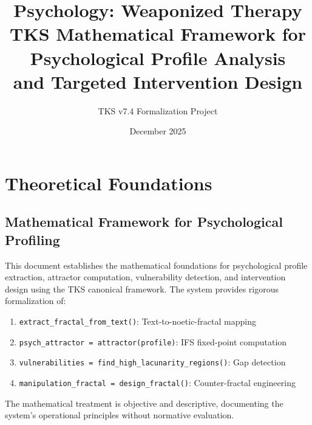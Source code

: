 \documentclass[11pt,twoside]{book}
\begin{document}
\title{\textbf{Psychology: Weaponized Therapy} \\[0.5em]
\Large TKS Mathematical Framework for Psychological Profile Analysis \\
and Targeted Intervention Design}
\author{TKS v7.4 Formalization Project}
\date{December 2025}
\maketitle

\tableofcontents

\part{Theoretical Foundations}

\chapter{Mathematical Framework for Psychological Profiling}
\label{ch:psychological-profiling}

\begin{tcolorbox}[colback=blue!5!white,colframe=blue!75!black,title=\textbf{Purpose and Scope},breakable]
This document establishes the mathematical foundations for psychological profile extraction,
attractor computation, vulnerability detection, and intervention design using the TKS canonical
framework. The system provides rigorous formalization of:
\begin{enumerate}
    \item \texttt{extract\_fractal\_from\_text()}: Text-to-noetic-fractal mapping
    \item \texttt{psych\_attractor = attractor(profile)}: IFS fixed-point computation
    \item \texttt{vulnerabilities = find\_high\_lacunarity\_regions()}: Gap detection
    \item \texttt{manipulation\_fractal = design\_fractal()}: Counter-fractal engineering
\end{enumerate}
The mathematical treatment is objective and descriptive, documenting the system's operational
principles without normative evaluation.
\end{tcolorbox}

\end{document}
